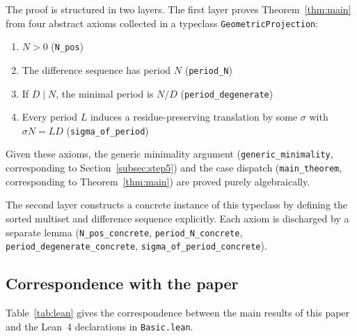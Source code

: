 \documentclass[11pt]{article}
\theoremstyle{plain}
\theoremstyle{definition}
\theoremstyle{remark}
\begin{document}
The proof is structured in two layers.  The first layer proves
Theorem~\ref{thm:main} from four abstract axioms collected in a
typeclass \texttt{GeometricProjection}:
\begin{enumerate}
    \item \(N > 0\) \hfill (\texttt{N\_pos})
    \item The difference sequence has period \(N\)
          \hfill (\texttt{period\_N})
    \item If \(D \mid N\), the minimal period is \(N/D\)
          \hfill (\texttt{period\_degenerate})
    \item Every period \(L\) induces a residue-preserving translation
          by some \(\sigma\) with \(\sigma N = LD\)
          \hfill (\texttt{sigma\_of\_period})
\end{enumerate}
Given these axioms, the generic minimality argument
(\texttt{generic\_minimality}, corresponding to
Section~\ref{subsec:step5}) and the case dispatch
(\texttt{main\_theorem}, corresponding to Theorem~\ref{thm:main})
are proved purely algebraically.

The second layer constructs a concrete instance of this typeclass
by defining the sorted multiset and difference sequence explicitly.
Each axiom is discharged by a separate lemma
(\texttt{N\_pos\_concrete}, \texttt{period\_N\_concrete},
\texttt{period\_degenerate\_concrete},
\texttt{sigma\_of\_period\_concrete}).

\subsection{Correspondence with the paper}\label{subsec:lean_corr}

Table~\ref{tab:lean} gives the correspondence between the main
results of this paper and the Lean~4 declarations in
\texttt{Basic.lean}.
\end{document}
